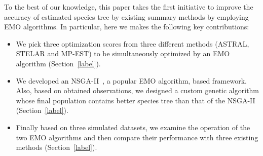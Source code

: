 To the best of our knowledge, this paper takes the first initiative to improve the accuracy of estimated species tree by existing summary methods by employing EMO algorithms.  In particular, here we makes the following key
contributions:

\begin{itemize}
	\item We pick three optimization scores from three different methods (ASTRAL, STELAR and MP-EST) to be simultaneously optimized by an EMO algorithm (Section~\ref{label}).  
	\item We developed an NSGA-II~\cite{deb2002fast}, a popular EMO algorithm, based  framework. Also, based on obtained observations, we designed a custom genetic algorithm whose final population contains better species tree than that of the NSGA-II (Section~\ref{label}). 
	\item Finally based on three simulated datasets, we examine the operation of the two EMO algorithms and then compare their performance with three existing methods (Section~\ref{label}). 
\end{itemize}


